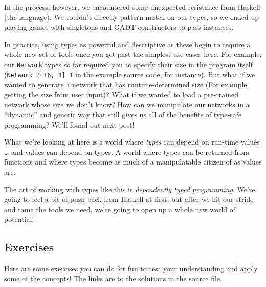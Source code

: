 \documentclass[]{article}
\begin{document}
In the process, however, we encountered some unexpected resistance from Haskell
(the language). We couldn't directly pattern match on our types, so we ended up
playing games with singletons and GADT constructors to pass instances.

In practice, using types as powerful and descriptive as these begin to require a
whole new set of tools once you get past the simplest use cases here. For
example, our \texttt{Network} types so far required you to specify their size in
the program itself (\texttt{Network\ 2\ \textquotesingle{}{[}16,\ 8{]}\ 1} in
the example source code, for instance). But what if we wanted to generate a
network that has runtime-determined size (For example, getting the size from
user input)? What if we wanted to load a pre-trained network whose size we don't
know? How can we manipulate our networks in a ``dynamic'' and generic way that
still gives us all of the benefits of type-safe programming? We'll found out
next post!

What we're looking at here is a world where \emph{types} can depend on run-time
values \ldots{} and values can depend on types. A world where types can be
returned from functions and where types become as much of a manipulatable
citizen of as values are.

The art of working with types like this is \emph{dependently typed programming}.
We're going to feel a bit of push back from Haskell at first, but after we hit
our stride and tame the tools we need, we're going to open up a whole new world
of potential!

\subsection{Exercises}\label{exercises}

Here are some exercises you can do for fun to test your understanding and apply
some of the concepts! The links are to the solutions in the source file.
\end{document}

